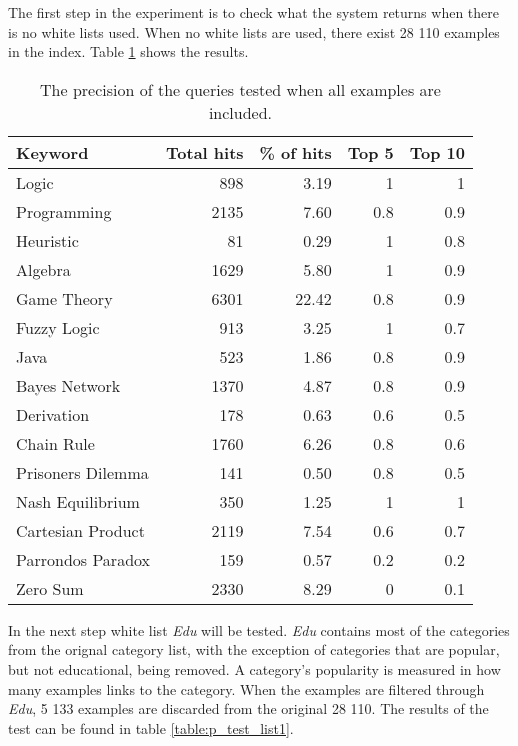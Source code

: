The first step in the experiment is to check what the system returns when there is no white lists used. When no white lists are used, there exist 28 110 examples in the index. Table \ref{table:p_test_no-list} shows the results.

\begin{table}[h]
\centering
\small
\begin{tabular} {|| p{10em} | r | r | r | r ||} 
 \hline
 Keyword & Total hits & \% of hits & Top 5 & Top 10 \\ [0.5ex] 
 \hline

Logic & 898 & 3.19 & 1 & 1 \\
Programming & 2135 & 7.60 & 0.8 & 0.9 \\
Heuristic & 81 & 0.29 & 1 & 0.8 \\
Algebra & 1629 & 5.80 & 1 & 0.9 \\
Game Theory & 6301 & 22.42 & 0.8 & 0.9 \\
\hline
Fuzzy Logic & 913 & 3.25 & 1 & 0.7 \\
Java & 523 & 1.86 & 0.8 & 0.9 \\
Bayes Network & 1370 & 4.87 & 0.8 & 0.9 \\
Derivation & 178 & 0.63 & 0.6 & 0.5 \\
\hline
Chain Rule & 1760 & 6.26 & 0.8 & 0.6 \\
Prisoners Dilemma & 141 & 0.50 & 0.8 & 0.5 \\
Nash Equilibrium & 350 & 1.25 & 1 & 1 \\
Cartesian Product & 2119 & 7.54 & 0.6 & 0.7 \\
Parrondos Paradox & 159 & 0.57 &  0.2 & 0.2 \\
Zero Sum & 2330 & 8.29 & 0 & 0.1 \\

 \hline
\end{tabular}
\caption{The precision of the queries tested when all examples are included.}
\label{table:p_test_no-list}
\end{table}
\clearpage

In the next step white list \textit{Edu} will be tested. \textit{Edu} contains most of the categories from the orignal category list, with the exception of categories that are popular, but not educational, being removed. A category's popularity is measured in how many examples links to the category. When the examples are filtered through \textit{Edu}, 5 133 examples are discarded from the original 28 110. The results of the test can be found in table \ref{table:p_test_list1}.

